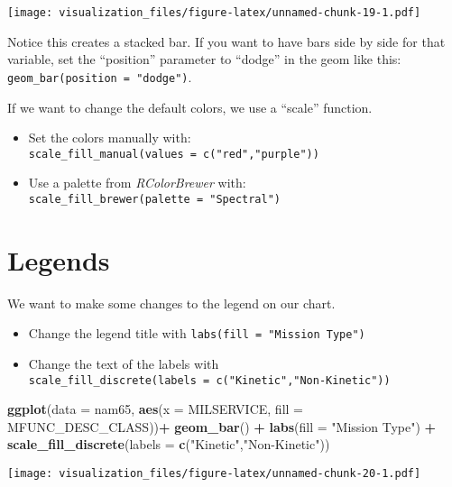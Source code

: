 \documentclass[oneside]{memoir}
\newenvironment{Shaded}{\begin{snugshade}}{\end{snugshade}}
\newcommand{\KeywordTok}[1]{\textcolor[rgb]{0.13,0.29,0.53}{\textbf{#1}}}
\newcommand{\DataTypeTok}[1]{\textcolor[rgb]{0.13,0.29,0.53}{#1}}
\newcommand{\StringTok}[1]{\textcolor[rgb]{0.31,0.60,0.02}{#1}}
\newcommand{\OperatorTok}[1]{\textcolor[rgb]{0.81,0.36,0.00}{\textbf{#1}}}
\newcommand{\NormalTok}[1]{#1}
\theoremstyle{definition}
\theoremstyle{definition}
\theoremstyle{definition}
\theoremstyle{remark}
\begin{document}
\texttt{[image: visualization\_files/figure-latex/unnamed-chunk-19-1.pdf]}

Notice this creates a stacked bar. If you want to have bars side by side
for that variable, set the ``position'' parameter to ``dodge'' in the
geom like this: \texttt{geom\_bar(position\ =\ "dodge")}.

If we want to change the default colors, we use a ``scale'' function.

\begin{itemize}
\item
  Set the colors manually with:
  \texttt{scale\_fill\_manual(values\ =\ c("red","purple"))}
\item
  Use a palette from \emph{RColorBrewer} with:
  \texttt{scale\_fill\_brewer(palette\ =\ "Spectral")}
\end{itemize}

\section{Legends}\label{legends}

We want to make some changes to the legend on our chart.

\begin{itemize}
\item
  Change the legend title with \texttt{labs(fill\ =\ "Mission\ Type")}
\item
  Change the text of the labels with
  \texttt{scale\_fill\_discrete(labels\ =\ c("Kinetic","Non-Kinetic"))}
\end{itemize}

\begin{Shaded}
\begin{Highlighting}[]
\KeywordTok{ggplot}\NormalTok{(}\DataTypeTok{data =}\NormalTok{ nam65, }\KeywordTok{aes}\NormalTok{(}\DataTypeTok{x =}\NormalTok{ MILSERVICE, }\DataTypeTok{fill =}\NormalTok{ MFUNC_DESC_CLASS))}\OperatorTok{+}
\StringTok{  }\KeywordTok{geom_bar}\NormalTok{() }\OperatorTok{+}
\StringTok{  }\KeywordTok{labs}\NormalTok{(}\DataTypeTok{fill =} \StringTok{"Mission Type"}\NormalTok{) }\OperatorTok{+}
\StringTok{  }\KeywordTok{scale_fill_discrete}\NormalTok{(}\DataTypeTok{labels =} \KeywordTok{c}\NormalTok{(}\StringTok{"Kinetic"}\NormalTok{,}\StringTok{"Non-Kinetic"}\NormalTok{))}
\end{Highlighting}
\end{Shaded}

\texttt{[image: visualization\_files/figure-latex/unnamed-chunk-20-1.pdf]}
\end{document}
